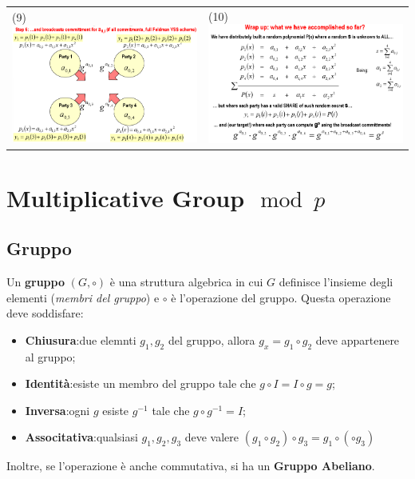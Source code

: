 \documentclass{book}
\begin{document}
\begin{tabularx}{0.99\textwidth}{X X}
    \\
    (9)\includegraphics[scale=0.4]{2022-01-02-16-07-44.png}%
     &
    (10)\includegraphics[scale=0.4]{2022-01-02-16-27-48.png}%
\end{tabularx}
\chapter{Multiplicative Group\(\mod{p}\)}
\section{Gruppo}
Un \textbf{gruppo} \((G,\circ )\) è una struttura algebrica in cui \(G\) definisce l'insieme degli elementi (\emph{membri del gruppo}) e \(\circ \) è l'operazione del gruppo\@. Questa operazione deve soddisfare:\begin{itemize}
    \item \textbf{Chiusura}:\@presi due elemnti \(g_{1},g_{2}\) del gruppo, allora \(g_{x}=g_{1}\circ g_{2}\) deve appartenere al gruppo;
    \item \textbf{Identità}:\@deve esiste un membro del gruppo tale che \(g\circ I = I\circ g=g\);
    \item \textbf{Inversa}:\@per ogni \(g\) esiste \(g^{-1}\) tale che \(g\circ g^{-1}=I\);
    \item \textbf{Associtativa}:\@per qualsiasi \(g_{1},g_{2},g_{3}\) deve valere \((g_{1}\circ g_{2})\circ g_{3}=g_{1}\circ (\circ g_{3})\)
\end{itemize}
Inoltre, se l'operazione è anche commutativa, si ha un \textbf{Gruppo Abeliano}\@.
\end{document}
